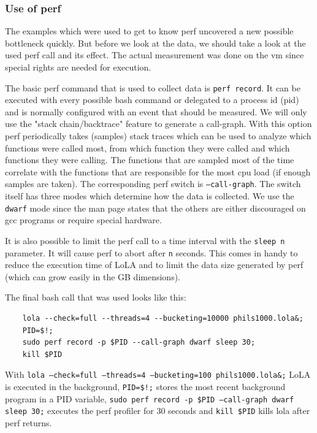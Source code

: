 \subsubsection{Use of perf}
The examples which were used to get to know perf uncovered a new possible bottleneck quickly. But before we look at the data, we should take a look at the used perf call and its effect. The actual measurement was done on the vm since special rights are needed for execution.

The basic perf command that is used to collect data is \texttt{perf record}. It can be executed with every possible bash command or delegated to a process id (pid) and is normally configured with an event that should be measured. We will only use the "stack chain/backtrace" feature to generate a call-graph. With this option perf periodically takes (samples) stack traces which can be used to analyze which functions were called most, from which function they were called and which functions they were calling. The functions that are sampled most of the time correlate with the functions that are responsible for the most cpu load (if enough samples are taken). The corresponding perf switch is \texttt{--call-graph}. The switch itself has three modes which determine how the data is collected. We use the \texttt{dwarf} mode since the man page states that the others are either discouraged on gcc programs or require special hardware.

It is also possible to limit the perf call to a time interval with the \texttt{sleep n} parameter. It will cause perf to abort after \texttt{n} seconds. This comes in handy to reduce the execution time of LoLA and to limit the data size generated by perf (which can grow easily in the GB dimensions).

The final bash call that was used looks like this:
\begin{lstlisting}
    lola --check=full --threads=4 --bucketing=10000 phils1000.lola&;
    PID=$!;
    sudo perf record -p $PID --call-graph dwarf sleep 30;
    kill $PID
\end{lstlisting}
With \texttt{lola --check=full --threads=4 --bucketing=100 phils1000.lola\&;} LoLA  is executed in the background, \texttt{PID=\$!;} stores the most recent background program in a PID variable, \texttt{sudo perf record -p \$PID --call-graph dwarf sleep 30;} executes the perf profiler for 30 seconds and \texttt{kill \$PID} kills lola after perf returns.

